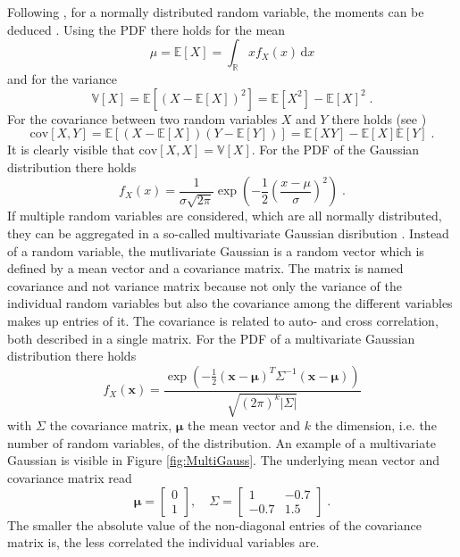 \documentclass[%
  a4paper,oneside,%
  11pt,%
  smallchapters,
  style=printdev,
  extramargin,
  green,%
  rgb, <cmyk>
  ]{tubsbook}
\begin{document}
Following \cite[pp. 33,34]{murphy2012}, for a normally distributed random variable, the moments can be deduced . Using the PDF there holds for the mean
\begin{equation}
\mu = \mathbb{E}[X] = \int_{\mathbb{R}} x f_X(x) \, \mathrm{d}x
\end{equation}
%
and for the variance
\begin{equation}
\mathbb{V}[X] = \mathbb{E}[(X-\mathbb{E}[X])^2] = \mathbb{E}[X^2] - \mathbb{E}[X]^2 \;.
\end{equation}
%
For the covariance between two random variables $X$ and $Y$ there holds (see \cite[p. 1434]{arens2015})
\begin{equation}
\mathrm{cov}[X,Y] = \mathbb{E}[(X-\mathbb{E}[X])(Y-\mathbb{E}[Y])] = \mathbb{E}[XY] - \mathbb{E}[X] \mathbb{E}[Y]\;.
\label{eqn:Covariance}
\end{equation}
It is clearly visible that $\mathrm{cov}[X,X] = \mathbb{V}[X]$.
%
For the PDF of the Gaussian distribution there holds \cite[p. 38]{murphy2012}
\begin{equation}
f_X(x) = \frac{1}{\sigma \sqrt{2 \pi}} \exp(-\frac{1}{2} \left(\frac{x-\mu}{\sigma}\right)^2) \;.
\label{eqn:GaussianPDF}
\end{equation}
%
If multiple random variables are considered, which are all normally distributed, they can be aggregated in a so-called multivariate Gaussian disribution \cite[p. 46]{murphy2012}. Instead of a random variable, the mutlivariate Gaussian is a random vector which is defined by a mean vector and a covariance matrix. The matrix is named covariance and not variance matrix because not only the variance of the individual random variables but also the covariance among the different variables makes up entries of it. The covariance is related to auto- and cross correlation, both described in a single matrix.
For the PDF of a multivariate Gaussian distribution there holds \cite[p. 46]{murphy2012}
\begin{equation}
f_X(\bm{x}) = \frac{\exp(-\frac{1}{2}(\bm{x}-\bm{\mu})^T \Sigma^{-1}(\bm{x}-\bm{\mu}))}{\sqrt{(2\pi)^k \lvert \Sigma \rvert}}
\label{eqn:MultivariateGaussian}
\end{equation}
with $\Sigma$ the covariance matrix, $\bm{\mu}$ the mean vector and $k$ the dimension, i.e. the number of random variables, of the distribution.
An example of a multivariate Gaussian is visible in Figure \ref{fig:MultiGauss}. The underlying mean vector and covariance matrix read
\begin{equation}
\bm{\mu} = \begin{bmatrix}
           0 \\
           1
         \end{bmatrix}
, \quad     
\Sigma = \begin{bmatrix}
1 & -0.7 \\
-0.7 & 1.5 
\end{bmatrix} \;.
\end{equation}
The smaller the absolute value of the non-diagonal entries of the covariance matrix is, the less correlated the individual variables are.
\end{document}
